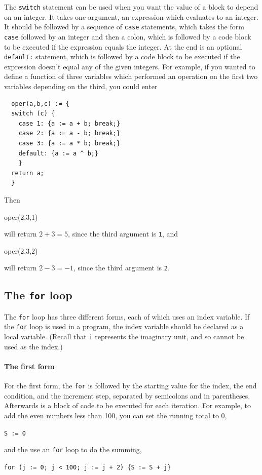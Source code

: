 \documentclass[a4paper,11pt]{book}
\begin{document}
The \texttt{switch} statement can be used when you want the value of
a block to depend on an integer.  It takes one argument, an
expression which evaluates to an integer.  It should be followed by
a sequence of \texttt{case} statements, which takes the form
\texttt{case} followed by an integer and then a colon, which is
followed by a code block to be executed if the expression equals the
integer.  At the end is an optional \texttt{default:}
statement, which is followed by a code block to be executed if the
expression doesn't equal any of the given integers.  For example, if
you wanted to define a function of three variables which performed an
operation on the first two variables depending on the third, you could
enter 
\begin{verbatim}
  oper(a,b,c) := {
  switch (c) {
    case 1: {a := a + b; break;}
    case 2: {a := a - b; break;}
    case 3: {a := a * b; break;}
    default: {a := a ^ b;}
    }
  return a;
  }
\end{verbatim}
Then
\begin{center}
  oper(2,3,1)
\end{center}
will return $2+3=5$, since the third argument is \texttt{1}, and 
\begin{center}
  oper(2,3,2)
\end{center}
will return $2-3=-1$, since the third argument is \texttt{2}.

\subsection{The \texttt{for} loop}

The \texttt{for} loop has three different forms, each of which uses an
index variable.  If the \texttt{for} loop is used in a program, the
index variable should be declared as a local variable.  (Recall that
\texttt{i} represents the imaginary unit, and so cannot be used as the
index.)

\paragraph{The first form}
For the first form, the \texttt{for} is followed by the starting value
for the index, the end condition, and the increment step, separated by
semicolons and in parentheses.  Afterwards is a block of code to be
executed for each iteration.  For example, to add the even numbers
less than 100, you can set the running total to 0,
\begin{center}
  {\tt S := 0}
\end{center}
and the use an \texttt{for} loop to do the summing,
\begin{center}
  {\tt for (j := 0; j < 100; j := j + 2) \{S := S + j\}}
\end{center}
\end{document}
